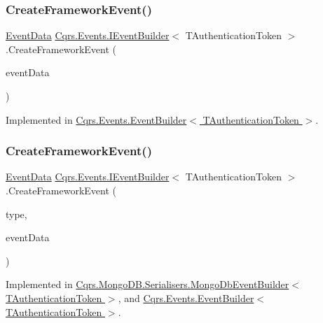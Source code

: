 \subsubsection{\texorpdfstring{Create\+Framework\+Event()}{CreateFrameworkEvent()}\hspace{0.1cm}{\footnotesize\ttfamily [1/2]}}
{\footnotesize\ttfamily \hyperlink{classCqrs_1_1Events_1_1EventData}{Event\+Data} \hyperlink{interfaceCqrs_1_1Events_1_1IEventBuilder}{Cqrs.\+Events.\+I\+Event\+Builder}$<$ T\+Authentication\+Token $>$.Create\+Framework\+Event (\begin{DoxyParamCaption}\item[{\hyperlink{interfaceCqrs_1_1Events_1_1IEvent}{I\+Event}$<$ T\+Authentication\+Token $>$}]{event\+Data }\end{DoxyParamCaption})}



Implemented in \hyperlink{classCqrs_1_1Events_1_1EventBuilder_abcc2515f98e4852ab656f1868e7a344c}{Cqrs.\+Events.\+Event\+Builder$<$ T\+Authentication\+Token $>$}.

\mbox{\label{interfaceCqrs_1_1Events_1_1IEventBuilder_ac77123302de4e79df9661c13219af4d4}} 
\subsubsection{\texorpdfstring{Create\+Framework\+Event()}{CreateFrameworkEvent()}\hspace{0.1cm}{\footnotesize\ttfamily [2/2]}}
{\footnotesize\ttfamily \hyperlink{classCqrs_1_1Events_1_1EventData}{Event\+Data} \hyperlink{interfaceCqrs_1_1Events_1_1IEventBuilder}{Cqrs.\+Events.\+I\+Event\+Builder}$<$ T\+Authentication\+Token $>$.Create\+Framework\+Event (\begin{DoxyParamCaption}\item[{string}]{type,  }\item[{\hyperlink{interfaceCqrs_1_1Events_1_1IEvent}{I\+Event}$<$ T\+Authentication\+Token $>$}]{event\+Data }\end{DoxyParamCaption})}



Implemented in \hyperlink{classCqrs_1_1MongoDB_1_1Serialisers_1_1MongoDbEventBuilder_a06afbb994fd3f679f275dea3d1d60c6e}{Cqrs.\+Mongo\+D\+B.\+Serialisers.\+Mongo\+Db\+Event\+Builder$<$ T\+Authentication\+Token $>$}, and \hyperlink{classCqrs_1_1Events_1_1EventBuilder_aa6a794ef27f2795802a4390fd16535f6}{Cqrs.\+Events.\+Event\+Builder$<$ T\+Authentication\+Token $>$}.

